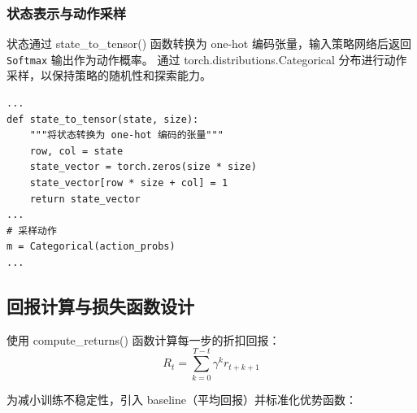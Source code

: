 \subsubsection{状态表示与动作采样}\label{subsubsec:REINFORCE-state-action}

状态通过 \textsf{state\_to\_tensor()} 函数转换为 one-hot 编码张量，输入策略网络后返回 \texttt{Softmax} 输出作为动作概率。
通过 \textsf{torch.distributions.Categorical} 分布进行动作采样，以保持策略的随机性和探索能力。

\begin{verbatim}
...
def state_to_tensor(state, size):
    """将状态转换为 one-hot 编码的张量"""
    row, col = state
    state_vector = torch.zeros(size * size)
    state_vector[row * size + col] = 1
    return state_vector
...
# 采样动作
m = Categorical(action_probs)
...
\end{verbatim}

\subsection{回报计算与损失函数设计}

使用 \textsf{compute\_returns()} 函数计算每一步的折扣回报：
\[
    R_t = \sum_{k=0}^{T-t} \gamma^k r_{t+k+1}
\]

为减小训练不稳定性，引入 baseline（平均回报）并标准化优势函数：

